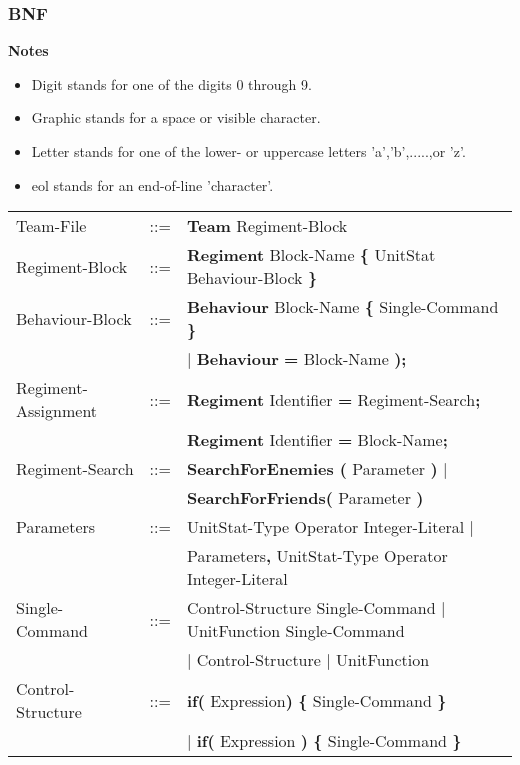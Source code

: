	\subsubsection{BNF}
		{\bf Notes}
		\begin{itemize}
			\item Digit stands for one of the digits 0 through 9.
			\item Graphic stands for a space or visible character.
			\item Letter stands for one of the lower- or uppercase letters 'a','b',.....,or 'z'.
			\item eol stands for an end-of-line 'character'.
		\end{itemize}
		\begin{center}
				\begin{longtable}{ l l l }
				\endfirsthead
				\endhead
				Team-File		   &	::=	 & {\bf Team} Regiment-Block \\
				Regiment-Block     &	::=	 & {\bf Regiment} Block-Name {\bf \{ } UnitStat Behaviour-Block \bf{\} }\\
				Behaviour-Block	   &	::=	 & {\bf Behaviour} Block-Name {\bf \{} Single-Command {\bf \}}  \\
								   &         & $\mid$ {\bf Behaviour} {\bf = } Block-Name {\bf );} \\
				Regiment-Assignment&    ::=  &{\bf Regiment} Identifier {\bf =} Regiment-Search{\bf ;}\\
								   &         &{\bf Regiment} Identifier {\bf =} Block-Name{\bf ;}\\
				Regiment-Search	   &	::=	 &{\bf SearchForEnemies (} Parameter {\bf )} $\mid$\\
								   &		 & {\bf SearchForFriends(} Parameter {\bf )}	 \\
				Parameters		   &	::=	 & UnitStat-Type Operator Integer-Literal $\mid$\\
								   &		 & Parameters{\bf ,} UnitStat-Type Operator Integer-Literal\\
				Single-Command     &	::=  & Control-Structure Single-Command $\mid$ UnitFunction Single-Command \\
								   &		 & $\mid$ Control-Structure $\mid$ UnitFunction					\\
				Control-Structure  &  	::=  & {\bf if( } Expression{\bf )} {\bf \{ } Single-Command {\bf \} }  \\
								   &		 & $\mid$ {\bf if(} Expression {\bf )} {\bf \{ }Single-Command {\bf \}} \\

\end{longtable}
\end{center}
